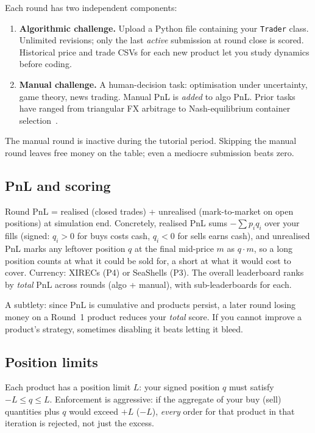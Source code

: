 Each round has two independent components:

\begin{enumerate}
  \item \textbf{Algorithmic challenge.}  Upload a Python file containing
  your \texttt{Trader} class.  Unlimited revisions; only the last
  \emph{active} submission at round close is scored.  Historical price
  and trade CSVs for each new product let you study dynamics before
  coding.

  \item \textbf{Manual challenge.}  A human-decision task: optimisation
  under uncertainty, game theory, news trading.  Manual PnL is
  \emph{added} to algo PnL.  Prior tasks have ranged from triangular FX
  arbitrage to Nash-equilibrium container
  selection~\citep{frankfurthedgehogs2025}.
\end{enumerate}

The manual round is inactive during the tutorial period.  Skipping the
manual round leaves free money on the table; even a mediocre submission
beats zero.

\subsection{PnL and scoring}

Round PnL = realised (closed trades) + unrealised (mark-to-market on
open positions) at simulation end.  Concretely, realised PnL sums
$-\sum p_i q_i$ over your fills (signed: $q_i>0$ for buys costs cash,
$q_i<0$ for sells earns cash), and unrealised PnL marks any leftover
position $q$ at the final mid-price $m$ as $q \cdot m$, so a long
position counts at what it could be sold for, a short at what it would
cost to cover.  Currency: XIRECs (P4) or SeaShells (P3).  The overall
leaderboard ranks by \emph{total} PnL across rounds (algo + manual),
with sub-leaderboards for each.

A subtlety: since PnL is cumulative and products persist, a later round
losing money on a Round~1 product reduces your \emph{total} score.  If
you cannot improve a product's strategy, sometimes disabling it beats
letting it bleed.

\subsection{Position limits}

Each product has a position limit $L$: your signed position $q$ must
satisfy $-L \le q \le L$.  Enforcement is aggressive: if the aggregate
of your buy (sell) quantities plus $q$ would exceed $+L$ ($-L$),
\emph{every} order for that product in that iteration is rejected, not
just the excess.


